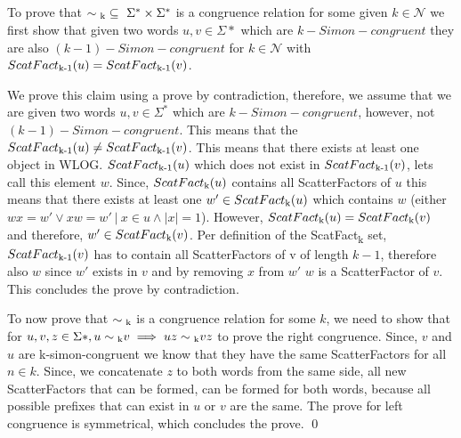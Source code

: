 \documentclass[a4paper,12pt,numbers=noenddot]{scrreport}
\begin{document}
\section{}

To prove that $\sim\textsubscript{k} \subseteq~ \Sigma^* \times \Sigma^*$ is a congruence relation for some given $k \in \mathcal{N}$ we first show that given two words $u, v \in \Sigma*$ which are $k-Simon-congruent$ they are also $(k-1)-Simon-congruent$ for $k \in \mathcal{N}$ with $ScatFact\textsubscript{k-1}(u) = ScatFact\textsubscript{k-1}(v)$.

We prove this claim using a prove by contradiction, therefore, we assume that we are given two words $u, v \in \Sigma^*$ which are $k-Simon-congruent$, however, not $(k-1)-Simon-congruent$.
This means that the $ScatFact\textsubscript{k-1}(u) \neq ScatFact\textsubscript{k-1}(v)$. This means that there exists at least one object in WLOG. $ScatFact\textsubscript{k-1}(u)$ which does not exist in $ScatFact\textsubscript{k-1}(v)$, lets call this element $w$.
Since, $ScatFact\textsubscript{k}(u)$ contains all ScatterFactors of $u$ this means that there exists at least one $w' \in ScatFact\textsubscript{k}(u)$ which contains $w$ (either $wx = w' \lor xw = w' ~|~ x \in u \land |x| = 1$).
However, $ScatFact\textsubscript{k}(u) = ScatFact\textsubscript{k}(v)$ and therefore, $w' \in ScatFact\textsubscript{k}(v)$.
Per definition of the ScatFact\textsubscript{k} set, $ScatFact\textsubscript{k-1}(v)$ has to contain all ScatterFactors of v of length $k-1$, therefore also $w$ since $w'$ exists in $v$ and by removing $x$ from $w'$ $w$ is a ScatterFactor of $v$.
This concludes the prove by contradiction.

To now prove that $\sim\textsubscript{k}$ is a congruence relation for some $k$, we need to show that for $u,v,z \in \Sigma*, u \sim\textsubscript{k} v \implies uz \sim\textsubscript{k} vz$ to prove the right congruence.
Since, $v$ and $u$ are k-simon-congruent we know that they have the same ScatterFactors for all $n \in k$.
Since, we concatenate $z$ to both words from the same side, all new ScatterFactors that can be formed, can be formed for both words, because all possible prefixes that can exist in $u$ or $v$ are the same.
The prove for left congruence is symmetrical, which concludes the prove.
\qed


\chapter{}
\section{}
\end{document}
